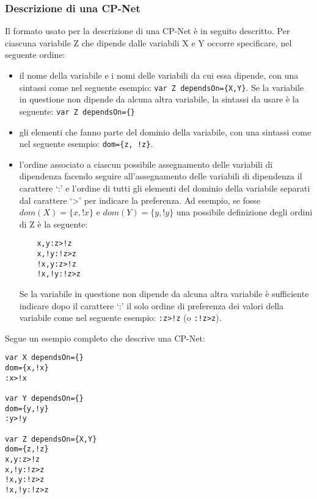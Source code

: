 \subsubsection{Descrizione di una CP-Net}
\label{sect:file}
Il formato usato per la descrizione di una CP-Net è in seguito
descritto.  Per ciascuna variabile Z che dipende dalle variabili X e Y
occorre specificare, nel seguente ordine:
\begin{itemize}
\item il nome della variabile e i nomi delle variabili da cui essa
  dipende, con una sintassi come nel seguente esempio: \texttt{var Z
    dependsOn=\{X,Y\}}. Se la variabile in questione non dipende da
  alcuna altra variabile, la sintassi da usare è la seguente:
  \texttt{var Z dependsOn=\{\}}
\item gli elementi che fanno parte del dominio della variabile, con
  una sintassi come nel seguente esempio: \texttt{dom=\{z, !z\}}.
\item l'ordine associato a ciascun possibile assegnamento delle
  variabili di dipendenza facendo seguire all'assegnamento delle
  variabili di dipendenza il carattere `:' e l'ordine di tutti gli
  elementi del dominio della variabile separati dal carattere `>'
  per indicare la preferenza. Ad esempio, se fosse
  $dom(X)=\{x,!x\}$ e $dom(Y)=\{y,!y\}$ una possibile definizione
  degli ordini di Z è la seguente:
  \begin{verbatim}
    x,y:z>!z
    x,!y:!z>z
    !x,y:z>!z
    !x,!y:!z>z
\end{verbatim}
  Se la variabile in questione non dipende da alcuna altra variabile è
  sufficiente indicare dopo il carattere `:' il solo ordine di
  preferenza dei valori della variabile come nel seguente esempio:
  \texttt{:z>!z} (o \texttt{:!z>z}).
\end{itemize}

Segue un esempio completo che descrive una CP-Net:
\begin{verbatim}
var X dependsOn={}
dom={x,!x}
:x>!x

var Y dependsOn={}
dom={y,!y}
:y>!y

var Z dependsOn={X,Y}
dom={z,!z}
x,y:z>!z
x,!y:!z>z
!x,y:!z>z
!x,!y:!z>z
\end{verbatim}